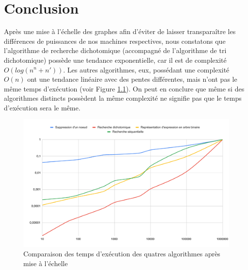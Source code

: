 \chapter{Conclusion}

Après une mise à l'échelle des graphes afin d'éviter de laisser transparaître les différences de puissances de nos machines respectives, nous constatons que l'algorithme de recherche dichotomique (accompagné de l'algorithme de tri dichotomique) possède une tendance exponentielle, car il est de complexité $O(log(n^n + n'))$. Les autres algorithmes, eux, possédant une complexité $O(n)$ ont une tendance linéaire avec des pentes différentes, mais n’ont pas le même temps d'exécution (voir Figure \ref{fig:fig_conclusion}). On peut en conclure que même si des algorithmes distincts possèdent la même complexité ne signifie pas que le temps d'exécution sera le même.

\begin{figure}[H]
    \centering
        \includegraphics[scale=0.5]{./ressources/graphe_conclusion.pdf}
        \caption{Comparaison des temps d'exécution des quatres algorithmes après mise à l'échelle}
    \label{fig:fig_conclusion}
\end{figure}
